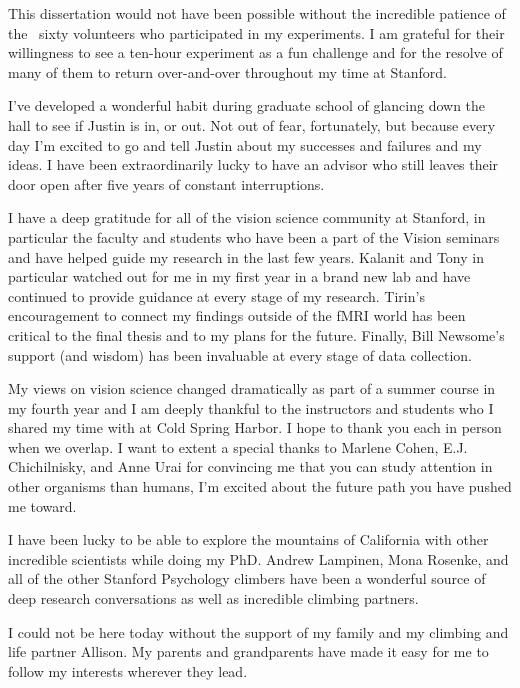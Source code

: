 This dissertation would not have been possible without the incredible patience of the ~sixty volunteers who participated in my experiments. I am grateful for their willingness to see a ten-hour experiment as a fun challenge and for the resolve of many of them to return over-and-over throughout my time at Stanford.

I've developed a wonderful habit during graduate school of glancing down the hall to see if Justin is in, or out. Not out of fear, fortunately, but because every day I'm excited to go and tell Justin about my successes and failures and my ideas. I have been extraordinarily lucky to have an advisor who still leaves their door open after five years of constant interruptions.

I have a deep gratitude for all of the vision science community at Stanford, in particular the faculty and students who have been a part of the Vision seminars and have helped guide my research in the last few years. Kalanit and Tony in particular watched out for me in my first year in a brand new lab and have continued to provide guidance at every stage of my research.  Tirin's encouragement to connect my findings outside of the fMRI world has been critical to the final thesis and to my plans for the future. Finally, Bill Newsome's support (and wisdom) has been invaluable at every stage of data collection.

My views on vision science changed dramatically as part of a summer course in my fourth year and I am deeply thankful to the instructors and students who I shared my time with at Cold Spring Harbor. I hope to thank you each in person when we overlap. I want to extent a special thanks to Marlene Cohen, E.J. Chichilnisky, and Anne Urai for convincing me that you can study attention in other organisms than humans, I'm excited about the future path you have pushed me toward.

I have been lucky to be able to explore the mountains of California with other incredible scientists while doing my PhD. Andrew Lampinen, Mona Rosenke, and all of the other Stanford Psychology climbers have been a wonderful source of deep research conversations as well as incredible climbing partners.

I could not be here today without the support of my family and my climbing and life partner Allison. My parents and grandparents have made it easy for me to follow my interests wherever they lead.